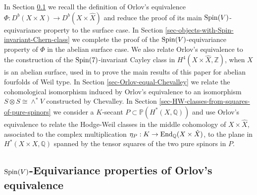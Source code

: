 \documentclass[12pt]{amsart}
\newcommand{\hide}[1]{}
\numberwithin{equation}{subsection}
\theoremstyle{plain}
\theoremstyle{definition}
\newtheorem{example}[thm]{Example}
\newcommand{\E}{{\mathcal E}}
\newcommand{\F}{{\mathcal F}}
\newcommand{\QQ}{{\mathbb Q}}
\newcommand{\M}{{\mathcal M}}
\newcommand{\ZZ}{{\mathbb Z}}
\newcommand{\PP}{{\mathbb P}}
\newcommand{\Spin}{{\rm Spin}}
\newcommand{\Ext}{{\rm Ext}}
\newcommand{\End}{{\rm End}}
\newcommand{\SheafExt}{{\mathcal E}xt}
\begin{document}
In Section \ref{sec-equivariance-properties-of-Orlov-equivalence}
we recall the definition of Orlov's equivalence $\Phi:D^b(X\times X)\rightarrow D^b(X\times\hat{X})$ and reduce the proof of its main $\Spin(V)$-equivariance property to the surface case. In Section \ref{sec-objects-with-Spin-invariant-Chern-class} we complete the proof of the $\Spin(V)$-equivariance property
of $\Phi$ in the abelian surface case. We also relate Orlov's equivalence to the construction of the $\Spin(7)$-invariant Cayley class in $H^4(X\times\hat{X},\ZZ)$,
when $X$ is an abelian surface, used in \cite{markman-generalized-kummers} to prove the main results of this paper for abelian fourfolds of Weil type.
In Section \ref{sec-Orlov-equal-Chevalley} we relate the cohomological isomorphism induced by Orlov's equivalence to an isomorphism
$S\otimes S\cong \wedge^*V$ constructed by Chevalley.
In Section \ref{sec-HW-classes-from-squares-of-pure-spinors} we consider a $K$-secant $P\subset \PP(H^*(X,\QQ))$ and use Orlov's equivalence to relate the Hodge-Weil classes in the middle cohomology of $X\times \hat{X}$, associated to the complex multiplication $\eta_P:K\rightarrow \End_\QQ(X\times\hat{X})$, to the plane in $H^*(X\times X,\QQ)$ spanned by the tensor squares of the two pure spinors in $P$. 


% 
\subsection{$\Spin(V)$-Equivariance properties of Orlov's equivalence}
\label{sec-equivariance-properties-of-Orlov-equivalence}


\hide{
\begin{example}
\label{example-F-i-in-M-2-0-n}
Let $X$ be a principally polarized abelian threefold and $\Theta$ its principal polarization. 
Choose two sheaves $F_1$, $F_2$ in the moduli space $\M(2,0,n\Theta)$ of Example 
\ref{example-gulbrandsen}, such that $F_2$ is not isomorphic to $\tau_x^*(F_1)\otimes L^{-1}$, for any $(x,L)\in X\times\hat{X}$.
Let
\[
\E^i_{F_1,F_2}:=\SheafExt^i_{\pi_{23}}\left(\pi_1^*F_1,\F_2\right)
\]
be the $i$-th relative extension sheaf over $X\times\hat{X}$, where $\F_2$ is associated to $F_2$ as in Equation  
(\ref{eq-universal-spreading-of-F}). Note that $\E^i_{F_1,F_2}$ vanishes if $i\not\in\{1,2\}$, and $\E^1_{F_1,F_2}$ is isomorphic to the dual of the pullback of $\E^2_{F_2,F_1}$ via the inversion map $(x,L)\mapsto (-x,L^{-1})$ over the Zariski open subset consisting of points $(x,L)$,
where the dimension of $\Ext^1(F_1,\tau_x^*(F_2)\otimes L^{-1})$ 
is minimal.
The techniques of \cite{gulbrandsen} should allow us to compute their rank, which is $0$ when $n=2$, their support, and hopefully their Chern classes, see Section \ref{subsec-n-equal-2-case}.
\end{example}

}
\end{document}
